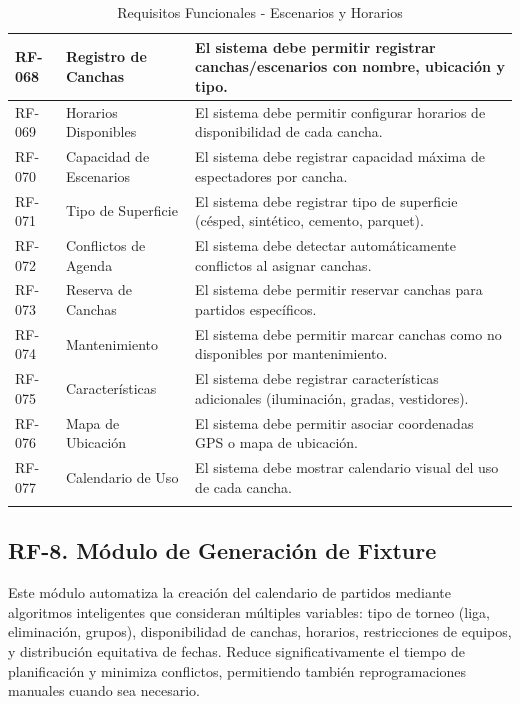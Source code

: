 \documentclass[12pt,a4paper]{article}
\begin{document}
\begin{longtable}{|>{\centering\arraybackslash}p{1.5cm}|>{\raggedright\arraybackslash}p{3.2cm}|>{\raggedright\arraybackslash}p{9cm}|}
RF-068 & Registro de Canchas & El sistema debe permitir registrar canchas/escenarios con nombre, ubicación y tipo. \\
\hline
\rowcolor{rowgray}
RF-069 & Horarios Disponibles & El sistema debe permitir configurar horarios de disponibilidad de cada cancha. \\
\hline
RF-070 & Capacidad de Escenarios & El sistema debe registrar capacidad máxima de espectadores por cancha. \\
\hline
\rowcolor{rowgray}
RF-071 & Tipo de Superficie & El sistema debe registrar tipo de superficie (césped, sintético, cemento, parquet). \\
\hline
RF-072 & Conflictos de Agenda & El sistema debe detectar automáticamente conflictos al asignar canchas. \\
\hline
\rowcolor{rowgray}
RF-073 & Reserva de Canchas & El sistema debe permitir reservar canchas para partidos específicos. \\
\hline
RF-074 & Mantenimiento & El sistema debe permitir marcar canchas como no disponibles por mantenimiento. \\
\hline
\rowcolor{rowgray}
RF-075 & Características & El sistema debe registrar características adicionales (iluminación, gradas, vestidores). \\
\hline
RF-076 & Mapa de Ubicación & El sistema debe permitir asociar coordenadas GPS o mapa de ubicación. \\
\hline
\rowcolor{rowgray}
RF-077 & Calendario de Uso & El sistema debe mostrar calendario visual del uso de cada cancha. \\
\hline
\caption{Requisitos Funcionales - Escenarios y Horarios}
\end{longtable}

\subsection{RF-8. Módulo de Generación de Fixture}

Este módulo automatiza la creación del calendario de partidos mediante algoritmos inteligentes que consideran múltiples variables: tipo de torneo (liga, eliminación, grupos), disponibilidad de canchas, horarios, restricciones de equipos, y distribución equitativa de fechas. Reduce significativamente el tiempo de planificación y minimiza conflictos, permitiendo también reprogramaciones manuales cuando sea necesario.
\end{document}
